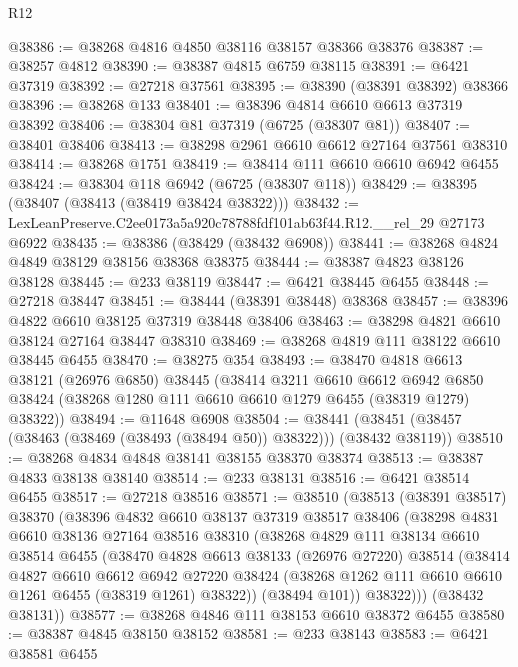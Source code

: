 \begin{lexlean}{R12}
\begin{coremodule}
@38386 := @38268 @4816 @4850 @38116 @38157 @38366 @38376
@38387 := @38257 @4812
@38390 := @38387 @4815 @6759 @38115
@38391 := @6421 @37319
@38392 := @27218 @37561
@38395 := @38390 (@38391 @38392) @38366
@38396 := @38268 @133
@38401 := @38396 @4814 @6610 @6613 @37319 @38392
@38406 := @38304 @81 @37319 (@6725 (@38307 @81))
@38407 := @38401 @38406
@38413 := @38298 @2961 @6610 @6612 @27164 @37561 @38310
@38414 := @38268 @1751
@38419 := @38414 @111 @6610 @6610 @6942 @6455
@38424 := @38304 @118 @6942 (@6725 (@38307 @118))
@38429 := @38395 (@38407 (@38413 (@38419 @38424 @38322)))
@38432 := LexLeanPreserve.C2ee0173a5a920c78788fdf101ab63f44.R12.__rel_29 @27173 @6922
@38435 := @38386 (@38429 (@38432 @6908))
@38441 := @38268 @4824 @4849 @38129 @38156 @38368 @38375
@38444 := @38387 @4823 @38126 @38128
@38445 := @233 @38119
@38447 := @6421 @38445 @6455
@38448 := @27218 @38447
@38451 := @38444 (@38391 @38448) @38368
@38457 := @38396 @4822 @6610 @38125 @37319 @38448 @38406
@38463 := @38298 @4821 @6610 @38124 @27164 @38447 @38310
@38469 := @38268 @4819 @111 @38122 @6610 @38445 @6455
@38470 := @38275 @354
@38493 := @38470
    @4818
    @6613
    @38121
    (@26976 @6850)
    @38445
    (@38414
      @3211
      @6610
      @6612
      @6942
      @6850
      @38424
      (@38268 @1280 @111 @6610 @6610 @1279 @6455 (@38319 @1279) @38322))
@38494 := @11648 @6908
@38504 := @38441 (@38451 (@38457 (@38463 (@38469 (@38493 (@38494 @50)) @38322))) (@38432 @38119))
@38510 := @38268 @4834 @4848 @38141 @38155 @38370 @38374
@38513 := @38387 @4833 @38138 @38140
@38514 := @233 @38131
@38516 := @6421 @38514 @6455
@38517 := @27218 @38516
@38571 := @38510
    (@38513
      (@38391 @38517)
      @38370
      (@38396
        @4832
        @6610
        @38137
        @37319
        @38517
        @38406
        (@38298
          @4831
          @6610
          @38136
          @27164
          @38516
          @38310
          (@38268
            @4829
            @111
            @38134
            @6610
            @38514
            @6455
            (@38470
              @4828
              @6613
              @38133
              (@26976 @27220)
              @38514
              (@38414
                @4827
                @6610
                @6612
                @6942
                @27220
                @38424
                (@38268 @1262 @111 @6610 @6610 @1261 @6455 (@38319 @1261) @38322))
              (@38494 @101))
            @38322)))
      (@38432 @38131))
@38577 := @38268 @4846 @111 @38153 @6610 @38372 @6455
@38580 := @38387 @4845 @38150 @38152
@38581 := @233 @38143
@38583 := @6421 @38581 @6455

\end{coremodule}
\end{lexlean}
